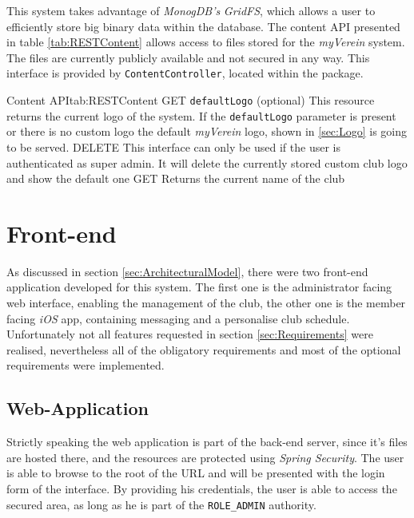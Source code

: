 This system takes advantage of \emph{MonogDB's} \emph{GridFS}, which allows a user to efficiently store big binary data within the database. The content \gls{API} presented in table \vref{tab:RESTContent} allows access to files stored for the \emph{myVerein} system. The files are currently publicly available and not secured in any way. This interface is provided by \texttt{ContentController}, located within the  package.

\begin{RESTTable}{Content API}{tab:RESTContent}
		{GET}
		{\texttt{defaultLogo} (optional)}
		{This resource returns the current logo of the system. If the \texttt{defaultLogo} parameter is present or there is no custom logo the default \emph{myVerein} logo, shown in \vref{sec:Logo} is going to be served.}
		{DELETE}
		{}
		{This interface can only be used if the user is authenticated as super admin. It will delete the currently stored custom club logo and show the default one}
		{GET}
		{}
		{Returns the current name of the club}
\end{RESTTable}

\section{Front-end}
\label{sec:FrontEnd}

As discussed in section \vref{sec:ArchitecturalModel}, there were two front-end application developed for this system. The first one is the administrator facing web interface, enabling the management of the club, the other one is the member facing \emph{iOS} app, containing messaging and a personalise club schedule. Unfortunately not all features requested in section \vref{sec:Requirements} were realised, nevertheless all of the obligatory requirements and most of the optional requirements were implemented.

\subsection{Web-Application}

Strictly speaking the web application is part of the back-end server, since it's files are hosted there, and the resources are protected using \emph{Spring Security}. The user is able to browse to the root of the \gls{URL} and will be presented with the login form of the interface. By providing his credentials, the user is able to access the secured area, as long as he is part of the \texttt{ROLE\_ADMIN} authority.

